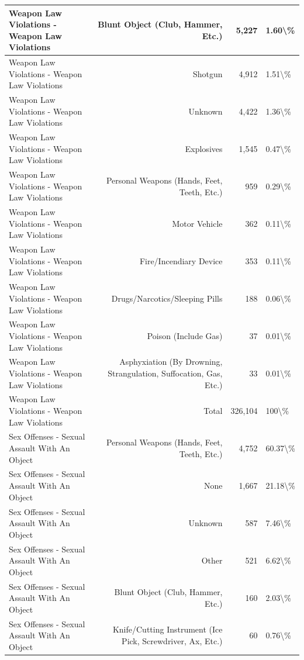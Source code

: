\documentclass[
]{krantz}
\begin{document}
\begin{longtable}[t]{l|r|r|l}
\hline
Weapon Law Violations - Weapon Law Violations & Blunt Object (Club, Hammer, Etc.) & 5,227 & 1.60\textbackslash{}\%\\
\hline
Weapon Law Violations - Weapon Law Violations & Shotgun & 4,912 & 1.51\textbackslash{}\%\\
\hline
Weapon Law Violations - Weapon Law Violations & Unknown & 4,422 & 1.36\textbackslash{}\%\\
\hline
Weapon Law Violations - Weapon Law Violations & Explosives & 1,545 & 0.47\textbackslash{}\%\\
\hline
Weapon Law Violations - Weapon Law Violations & Personal Weapons (Hands, Feet, Teeth, Etc.) & 959 & 0.29\textbackslash{}\%\\
\hline
Weapon Law Violations - Weapon Law Violations & Motor Vehicle & 362 & 0.11\textbackslash{}\%\\
\hline
Weapon Law Violations - Weapon Law Violations & Fire/Incendiary Device & 353 & 0.11\textbackslash{}\%\\
\hline
Weapon Law Violations - Weapon Law Violations & Drugs/Narcotics/Sleeping Pills & 188 & 0.06\textbackslash{}\%\\
\hline
Weapon Law Violations - Weapon Law Violations & Poison (Include Gas) & 37 & 0.01\textbackslash{}\%\\
\hline
Weapon Law Violations - Weapon Law Violations & Asphyxiation (By Drowning, Strangulation, Suffocation, Gas, Etc.) & 33 & 0.01\textbackslash{}\%\\
\hline
Weapon Law Violations - Weapon Law Violations & Total & 326,104 & 100\textbackslash{}\%\\
\hline
Sex Offenses - Sexual Assault With An Object & Personal Weapons (Hands, Feet, Teeth, Etc.) & 4,752 & 60.37\textbackslash{}\%\\
\hline
Sex Offenses - Sexual Assault With An Object & None & 1,667 & 21.18\textbackslash{}\%\\
\hline
Sex Offenses - Sexual Assault With An Object & Unknown & 587 & 7.46\textbackslash{}\%\\
\hline
Sex Offenses - Sexual Assault With An Object & Other & 521 & 6.62\textbackslash{}\%\\
\hline
Sex Offenses - Sexual Assault With An Object & Blunt Object (Club, Hammer, Etc.) & 160 & 2.03\textbackslash{}\%\\
\hline
Sex Offenses - Sexual Assault With An Object & Knife/Cutting Instrument (Ice Pick, Screwdriver, Ax, Etc.) & 60 & 0.76\textbackslash{}\%\\

\end{longtable}
\end{document}
